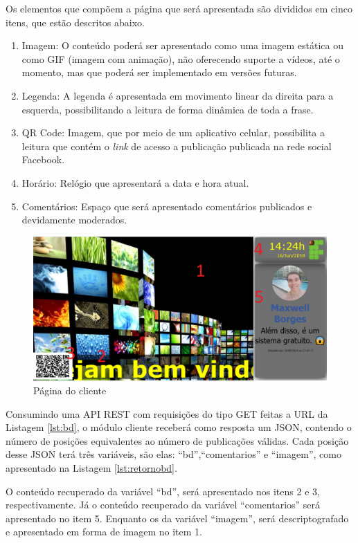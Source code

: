 Os elementos que compõem a página que será apresentada são divididos em cinco itens, que estão descritos abaixo.

\begin{enumerate}
   \item Imagem: O conteúdo poderá ser apresentado como uma imagem estática ou como GIF (imagem com animação), não oferecendo suporte a vídeos, até o momento, mas que poderá ser implementado em versões futuras. 
   \item Legenda: A legenda é apresentada em movimento linear da direita para a esquerda, possibilitando a leitura de forma dinâmica de toda a frase.
   \item QR Code: Imagem, que por meio de um aplicativo celular, possibilita a leitura que contém o \textit{link} de acesso a publicação publicada na rede social Facebook.
   \item Horário: Relógio que apresentará a data e hora atual.  
   \item Comentários: Espaço que será apresentado comentários publicados e devidamente moderados.
 \end{enumerate}
  
\begin{figure}[H]
\centering
\includegraphics[scale=0.3]{figuras/cliente1}
\caption{Página do cliente}
\label{fig:cliente1}
\end{figure}

Consumindo uma API REST com requisições do tipo GET feitas a URL da Listagem \ref{lst:bd}, o módulo cliente receberá como resposta um JSON, contendo o número de posições equivalentes ao número de publicações válidas. Cada posição desse JSON terá três variáveis, são elas: ``bd'',``comentarios'' e ``imagem'', como apresentado na Listagem \ref{lst:retornobd}. 

O conteúdo recuperado da variável ``bd'', será apresentado nos itens 2 e 3, respectivamente. Já o conteúdo recuperado da variável ``comentarios'' será apresentado no item 5. Enquanto os da variável ``imagem'', será descriptografado e apresentado em forma de imagem no item 1.


